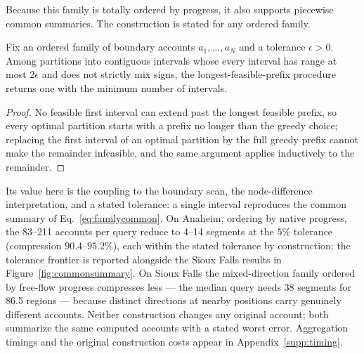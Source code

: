 Because this family is totally ordered by progress, it also supports
piecewise common summaries. The construction is stated for any ordered
family.
\begin{proposition}\label{prop:segmented}
Fix an ordered family of boundary accounts $a_1,\ldots,a_N$ and a
tolerance $\epsilon>0$. Among partitions into contiguous intervals
whose every interval has range at most $2\epsilon$ and does not
strictly mix signs, the longest-feasible-prefix procedure returns one
with the minimum number of intervals.
\end{proposition}
\begin{proof}
No feasible first interval can extend past the longest feasible prefix,
so every optimal partition starts with a prefix no longer than the
greedy choice; replacing the first interval of an optimal partition by
the full greedy prefix cannot make the remainder infeasible, and the
same argument applies inductively to the remainder.
\end{proof}
Its value here is the coupling to the boundary scan, the
node-difference interpretation, and a stated tolerance: a single
interval reproduces the common summary of Eq.~\eqref{eq:familycommon}.
On Anaheim, ordering by native progress, the 83--211 accounts per query
reduce to 4--14 segments at the $5\%$ tolerance (compression
$90.4$--$95.2\%$), each within the stated tolerance by construction;
the tolerance frontier is reported alongside the Sioux Falls results
in Figure~\ref{fig:commonsummary}. On Sioux Falls the mixed-direction
family ordered by free-flow progress compresses less --- the median
query needs 38 segments for 86.5 regions --- because distinct
directions at nearby positions carry genuinely different accounts.
Neither construction changes any original account; both summarize the
same computed accounts with a stated worst error. Aggregation timings
and the original construction costs appear in
Appendix~\ref{supp:timing}.
